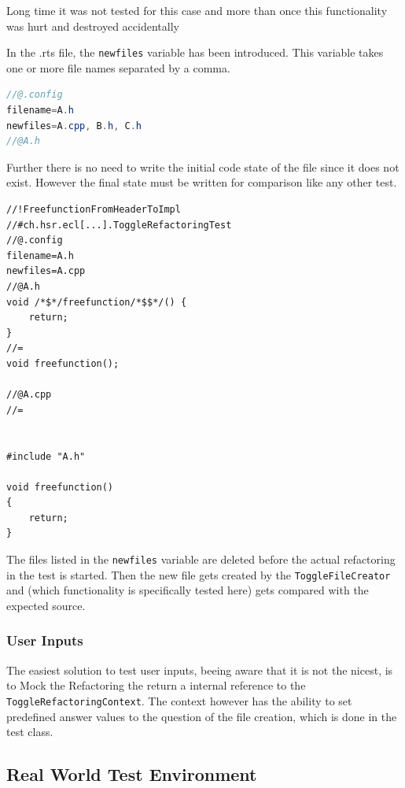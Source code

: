 Long time it was not tested for this case and more than once this functionality
was hurt and destroyed accidentally 

In the .rts file, the \texttt{newfiles} variable has been introduced. This
variable takes one or more file names separated by a comma.

\begin{lstlisting}[caption={Syntax to set variables inside a .rts file},
language=java]
//@.config
filename=A.h
newfiles=A.cpp, B.h, C.h
//@A.h
\end{lstlisting}

Further there is no need to write the initial code state of the file since it
does not exist. However the final state must be written for comparison like
any other test.

\begin{lstlisting}[caption={Writing test for newfile creation }]
//!FreefunctionFromHeaderToImpl
//#ch.hsr.ecl[...].ToggleRefactoringTest
//@.config
filename=A.h
newfiles=A.cpp
//@A.h
void /*$*/freefunction/*$$*/() {
    return;
}
//=
void freefunction();

//@A.cpp
//=


#include "A.h"

void freefunction()
{
    return;
}
\end{lstlisting}

The files listed in the \texttt{newfiles} variable are deleted before the
actual refactoring in the test is started. Then the new file gets created by
the \texttt{ToggleFileCreator} and (which functionality is specifically tested
here) gets compared with the expected source.


\subsubsection{User Inputs}

The easiest solution to test user inputs, beeing aware that it is not the
nicest, is to Mock the Refactoring the return a internal reference to the
\texttt{ToggleRefactoringContext}. The context however has the ability to set
predefined answer values to the question of the file creation, which is done in
the test class.

\subsection{Real World Test Environment}

